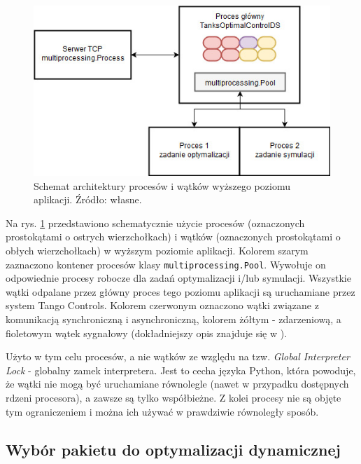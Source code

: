 \begin{figure}[ht]
    \centering
    \includegraphics[scale=0.8]{Grafika/tanks_opt_ctrl_architecture}
    \caption{Schemat architektury procesów i wątków wyższego poziomu aplikacji. Źródło: własne.}
    \label{fig:tanksoptctrlarchitecture}
\end{figure}

Na rys. \ref{fig:tanksoptctrlarchitecture} przedstawiono schematycznie użycie procesów (oznaczonych prostokątami o ostrych wierzchołkach) i wątków (oznaczonych prostokątami o obłych wierzchołkach) w wyższym poziomie aplikacji. Kolorem szarym zaznaczono kontener procesów klasy \texttt{multiprocessing.Pool}. Wywołuje on odpowiednie procesy robocze dla zadań optymalizacji i/lub symulacji. Wszystkie wątki odpalane przez główny proces tego poziomu aplikacji są uruchamiane przez system Tango Controls. Kolorem czerwonym oznaczono wątki związane z komunikacją synchroniczną i asynchroniczną, kolorem żółtym - zdarzeniową, a fioletowym wątek sygnałowy (dokładniejszy opis znajduje się w \cite{TangoDocs}).

Użyto w tym celu procesów, a nie wątków ze względu na tzw. \emph{Global Interpreter Lock} - globalny zamek interpretera. Jest to cecha języka Python, która powoduje, że wątki nie mogą być uruchamiane równolegle (nawet w przypadku dostępnych rdzeni procesora), a zawsze są tylko współbieżne. Z kolei procesy nie są objęte tym ograniczeniem i można ich używać w prawdziwie równoległy sposób.


\subsection{Wybór pakietu do optymalizacji dynamicznej}
\label{sub:czesc-wyzsza-wybor}

